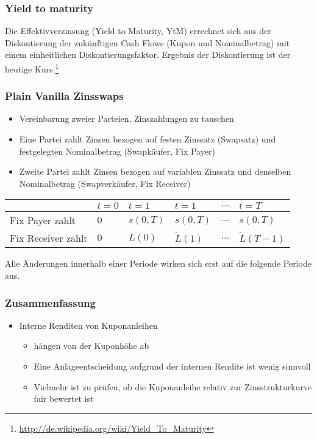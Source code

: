 \subsubsection{Yield to maturity}
Die Effektivverzinsung (Yield to Maturity, YtM) errechnet sich aus der Diskontierung der zukünftigen Cash Flows (Kupon und Nominalbetrag) mit einem einheitlichen Diskontierungsfaktor. Ergebnis der Diskontierung ist der heutige Kurs.\footnote{\url{http://de.wikipedia.org/wiki/Yield_To_Maturity}}

\subsubsection{Plain Vanilla Zinsswaps}
\begin{itemize}
	\item Vereinbarung zweier Parteien, Zinszahlungen zu tauschen
	\item Eine Partei zahlt Zinsen bezogen auf festen Zinssatz (Swapsatz) und festgelegten Nominalbetrag (Swapkäufer, Fix Payer)
	\item Zweite Partei zahlt Zinsen bezogen auf variablen Zinssatz und denselben Nominalbetrag (Swapverkäufer, Fix Receiver)
\end{itemize}

\begin{tabularx}{\columnwidth}{l|X|X|X|c|l}
						& \(t=0\) 	& \(t=1\)		& \(t=1\)			& \(\dots\) 	& \(t=T\) \\
	\hline
	Fix Payer zahlt 	& \(0\)		& \(s(0,T)\)	& \(s(0,T)\)		& \(\dots\)		& \(s(0,T)\) \\
	Fix Receiver zahlt 	& \(0\)		& \(L(0)\)		& \(\tilde{L}(1)\)	& \(\dots\)		& \(\tilde{L}(T-1)\)
\end{tabularx}

Alle Änderungen innerhalb einer Periode wirken sich erst auf die folgende Periode aus.

\subsubsection{Zusammenfassung}
\begin{itemize}
	\item Interne Renditen von Kuponanleihen
	\begin{itemize}
		\item hängen von der Kuponhöhe ab
		\item Eine Anlageentscheidung aufgrund der internen Rendite ist wenig sinnvoll
		\item Vielmehr ist zu prüfen, ob die Kuponanleihe relativ zur Zinsstrukturkurve fair bewertet ist
	\end{itemize}
\end{itemize}


